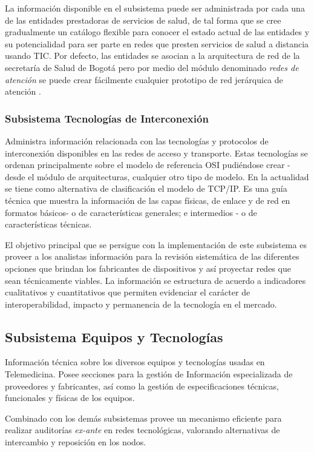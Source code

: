La información disponible en el subsistema puede ser administrada por cada una de las entidades prestadoras de servicios de salud, de tal forma que se cree gradualmente un catálogo flexible para conocer el estado actual de las entidades y su potencialidad para ser parte en redes que presten servicios de salud a distancia usando TIC. Por defecto, las entidades se asocian a la arquitectura de red de la secretaría de Salud de Bogotá pero por medio del módulo denominado \textit{redes de atención} se puede crear fácilmente cualquier prototipo de red jerárquica de atención \cite{yellowlees}.

\subsubsection{Subsistema Tecnologías de Interconexión} 
Administra información relacionada con las tecnologías y protocolos de interconexión disponibles en las redes de acceso y transporte. Estas tecnologías se ordenan principalmente sobre el modelo de referencia OSI pudiéndose crear  - desde el módulo de arquitecturas, cualquier otro tipo de modelo. En la actualidad se tiene como alternativa de clasificación el modelo de TCP/IP. Es una guía técnica que muestra la información de las capas físicas, de enlace y de red en formatos básicos- o de características generales; e intermedios - o de características técnicas.

El objetivo principal que se persigue con la implementación de este subsistema es proveer a los analistas información para la revisión sistemática de las diferentes opciones que brindan los fabricantes de dispositivos y así proyectar redes que sean técnicamente viables. La información se estructura de acuerdo a indicadores cualitativos y cuantitativos que permiten evidenciar el carácter de interoperabilidad, impacto y permanencia de la tecnología en el mercado. 

\subsection{Subsistema Equipos y Tecnologías}
Información técnica sobre los diversos equipos y tecnologías usadas en Telemedicina. Posee secciones para la gestión de Información especializada de proveedores y fabricantes, así como la gestión de especificaciones técnicas, funcionales y físicas de los equipos.

Combinado con los demás subsistemas provee un mecanismo eficiente para realizar auditorías \textit{ex-ante} en redes tecnológicas, valorando alternativas de intercambio y reposición en los nodos.

